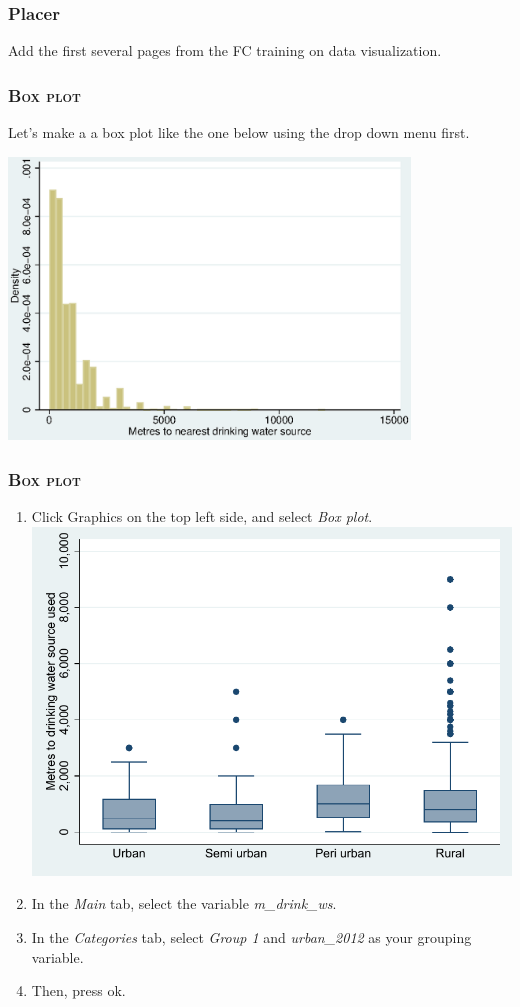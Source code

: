 \documentclass[10pt]{beamer}
\begin{document}
	\begin{frame}
	\frametitle{Placer}
	Add the first several pages from the FC training on data visualization.
	\end{frame}
	
	\begin{frame}
	\frametitle{\textsc{Box plot}}
		 Let's make a a box plot like the one below 
					 using the drop down menu first.
\begin{center}
    \includegraphics[width=0.8\textwidth]{stata_workshop_for_govt_officials_4.eps}
\end{center}
	\end{frame}
	
	\begin{frame}
	\frametitle{\textsc{Box plot}}	
		\begin{enumerate}
			 \item Click Graphics on the top left side, and select \textit{Box plot}.
			\vspace{2mm} \includegraphics[width=0.5\linewidth]{boxplot_1}
			\onslide<2-> \item In the \textit{Main} tab, select the variable \textit{m\_drink\_ws}.
			\onslide<3-> \item In the \textit{Categories} tab, select \textit{Group 1} and \textit{urban\_2012} as your grouping variable.
			\onslide<4-> \item Then, press ok.
		\end{enumerate}
	\end{frame}
\end{document}

